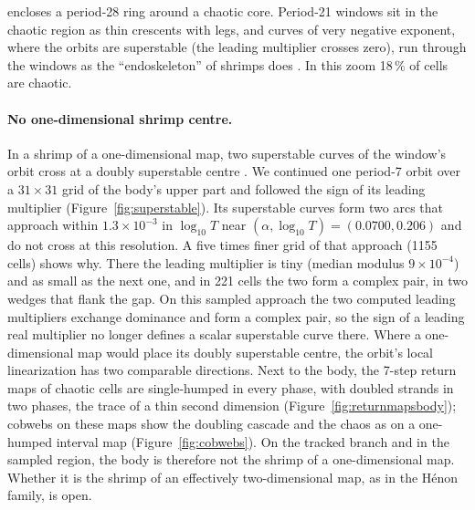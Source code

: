 encloses a period-28 ring around a chaotic core. Period-21 windows sit in the chaotic region as thin crescents with
legs, and curves of very negative exponent, where the orbits are superstable (the leading multiplier crosses zero),
run through the windows as the ``endoskeleton'' of shrimps does \cite{facanha2013endoskeletons}. In this zoom
18\,\% of cells are chaotic.

\paragraph{No one-dimensional shrimp centre.} In a shrimp of a one-dimensional map, two superstable curves of the
window's orbit cross at a doubly superstable centre \cite{gallas1993structure,facanha2013endoskeletons}. We continued
one period-7 orbit over a $31\times31$ grid of the body's upper part and followed the sign of its leading multiplier
(Figure~\ref{fig:superstable}). Its superstable curves form two arcs that approach within $1.3\times10^{-3}$ in
$\log_{10}T$ near $(\alpha,\log_{10}T)=(0.0700,0.206)$ and do not cross at this resolution. A five times finer grid of that approach
(1155 cells) shows why. There the leading multiplier is tiny (median modulus $9\times10^{-4}$) and as small as the next
one, and in 221 cells the two form a complex pair, in two wedges that flank the gap. On this sampled approach the two
computed leading multipliers exchange dominance and form a complex pair, so the sign of a leading real multiplier no
longer defines a scalar superstable curve there. Where a one-dimensional map would place its doubly superstable centre,
the orbit's local linearization has two comparable directions. Next to the body, the 7-step return maps of chaotic
cells are single-humped in every phase, with doubled strands in two phases, the trace of a thin second dimension
(Figure~\ref{fig:returnmapsbody}); cobwebs on these maps show the doubling cascade and the chaos as on a
one-humped interval map (Figure~\ref{fig:cobwebs}). On the tracked branch and in the sampled region, the body is
therefore not the shrimp of a one-dimensional map. Whether it is the shrimp of an effectively
two-dimensional map, as in the H\'enon family, is open.

